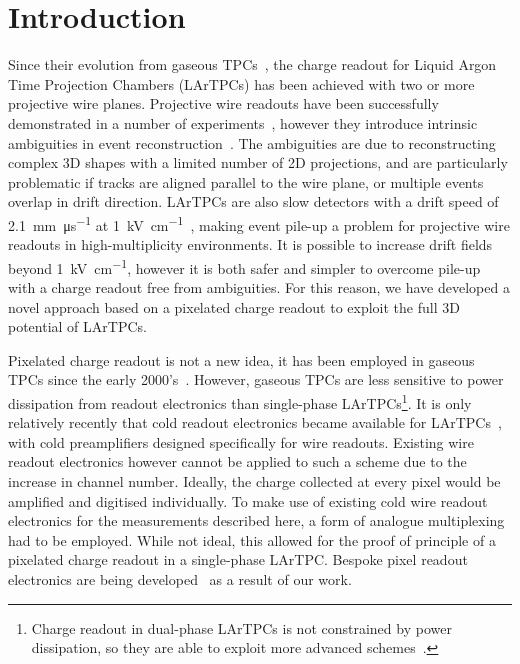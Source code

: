 \documentclass[instruments,article,submit,moreauthors,pdftex]{Definitions/mdpi}
\begin{document}

\section{Introduction} \label{sec:Intro}

Since their evolution from gaseous TPCs~\cite{TPC,LArIonize,LArTPC}, the charge readout for Liquid Argon Time Projection Chambers (LArTPCs) has been achieved with two or more projective wire planes. 
Projective wire readouts have been successfully demonstrated in a number of experiments~\cite{icarus,argonute,uboner}, however they introduce intrinsic ambiguities in event reconstruction~\cite{ambiguous}. 
The ambiguities are due to reconstructing complex 3D shapes with a limited number of 2D projections, and are particularly problematic if tracks are aligned parallel to the wire plane, or multiple events overlap in drift direction.    
LArTPCs are also slow detectors with a drift speed of \SI{2.1}{\milli\metre\per\micro\second} at \SI{1}{\kilo\volt\per\centi\metre}~\cite{protoLASER}, making event pile-up a problem for projective wire readouts in high-multiplicity environments.
It is possible to increase drift fields beyond \SI{1}{\kilo\volt\per\centi\metre}\cite{breakdown_16, latex}, however it is both safer and simpler to overcome pile-up with a charge readout free from ambiguities. 
For this reason, we have developed a novel approach based on a pixelated charge readout to exploit the full 3D potential of LArTPCs.

Pixelated charge readout is not a new idea, it has been employed in gaseous TPCs since the early 2000's~\cite{gaspix}. 
However, gaseous TPCs are less sensitive to power dissipation from readout electronics than single-phase LArTPCs\footnote{Charge readout in dual-phase LArTPCs is not constrained by power dissipation, so they are able to exploit more advanced schemes~\cite{Far_Detectors}.}. 
It is only relatively recently that cold readout electronics became available for LArTPCs~\cite{larasic}, with cold preamplifiers designed specifically for wire readouts.  
Existing wire readout electronics however cannot be applied to such a scheme due to the increase in channel number.  
Ideally, the charge collected at every pixel would be amplified and digitised individually.
To make use of existing cold wire readout electronics for the measurements described here, a form of analogue multiplexing had to be employed. 
While not ideal, this allowed for the proof of principle of a pixelated charge readout in a single-phase LArTPC.   
Bespoke pixel readout electronics are being developed~\cite{larpix} as a result of our work.
\end{document}
